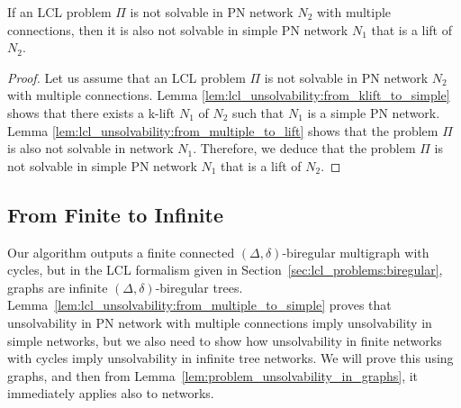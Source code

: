 \begin{lemma} \label{lem:lcl_unsolvability:from_multiple_to_simple}
    If an LCL problem $\Pi$ is not solvable in PN network $N_2$ with multiple connections, then it is also not solvable in simple PN network $N_1$ that is a lift of $N_2$.
\end{lemma}
\begin{proof}
    Let us assume that an LCL problem $\Pi$ is not solvable in PN network $N_2$ with multiple connections.
    Lemma \ref{lem:lcl_unsolvability:from_klift_to_simple} shows that there exists a k-lift $N_1$ of $N_2$ such that $N_1$ is a simple PN network.
    Lemma \ref{lem:lcl_unsolvability:from_multiple_to_lift} shows that the problem $\Pi$ is also not solvable in network $N_1$.
    Therefore, we deduce that the problem $\Pi$ is not solvable in simple PN network $N_1$ that is a lift of $N_2$.
\end{proof}


\subsection{From Finite to Infinite} \label{sec:algorithm:from_finite_to_infinite}
Our algorithm outputs a finite connected $(\Delta, \delta)$-biregular multigraph with cycles, but in the LCL formalism given in Section~\ref{sec:lcl_problems:biregular}, graphs are infinite $(\Delta, \delta)$-biregular trees.
Lemma~\ref{lem:lcl_unsolvability:from_multiple_to_simple} proves that unsolvability in PN network with multiple connections imply unsolvability in simple networks, but we also need to show how unsolvability in finite networks with cycles imply unsolvability in infinite tree networks.
We will prove this using graphs, and then from Lemma~\ref{lem:problem_unsolvability_in_graphs}, it immediately applies also to networks.

